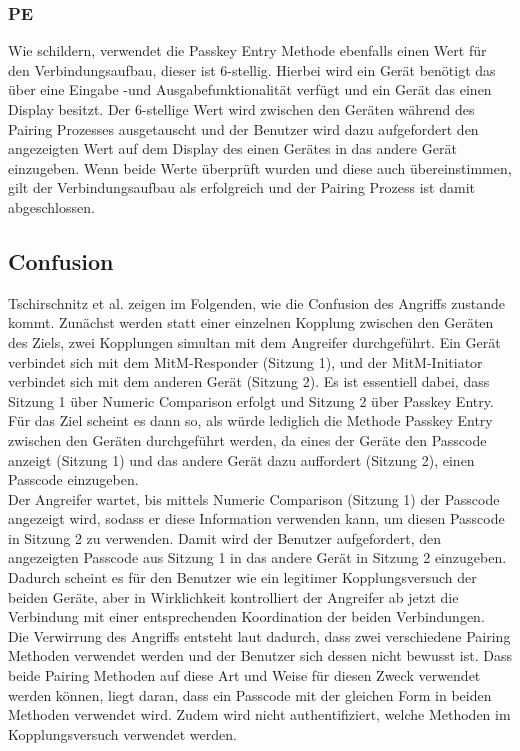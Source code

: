 \documentclass[
    a4paper,
    pagesize,
    pdftex,
    12pt,
]{scrartcl}
\begin{document}
    \subsubsection{PE}
    Wie \cite{method_confusion_attack} schildern, verwendet die Passkey Entry Methode ebenfalls einen Wert für den Verbindungsaufbau, dieser ist 6-stellig. Hierbei wird ein Gerät benötigt das über eine Eingabe -und Ausgabefunktionalität verfügt und ein Gerät das einen Display besitzt. Der 6-stellige Wert wird zwischen den Geräten während des Pairing Prozesses ausgetauscht und der Benutzer wird dazu aufgefordert den angezeigten Wert auf dem Display des einen Gerätes in das andere Gerät einzugeben. Wenn beide Werte überprüft wurden und diese auch übereinstimmen, gilt der Verbindungsaufbau als erfolgreich und der Pairing Prozess ist damit abgeschlossen.

    \subsection{Confusion}
    Tschirschnitz et al. \cite{method_confusion_attack} zeigen im Folgenden, wie die Confusion des Angriffs zustande kommt. Zunächst werden statt einer einzelnen Kopplung zwischen den Geräten des Ziels, zwei Kopplungen simultan mit dem Angreifer durchgeführt. Ein Gerät verbindet sich mit dem MitM-Responder (Sitzung 1), und der MitM-Initiator verbindet sich mit dem anderen Gerät (Sitzung 2). Es ist essentiell dabei, dass Sitzung 1 über Numeric Comparison erfolgt und Sitzung 2 über Passkey Entry. Für das Ziel scheint es dann so, als würde lediglich die Methode Passkey Entry zwischen den Geräten durchgeführt werden, da eines der Geräte den Passcode anzeigt (Sitzung 1)  und das andere Gerät dazu auffordert (Sitzung 2), einen Passcode einzugeben. \\
    Der Angreifer wartet, bis mittels Numeric Comparison (Sitzung 1) der Passcode angezeigt wird, sodass er diese Information verwenden kann, um diesen Passcode in Sitzung 2 zu verwenden. Damit wird der Benutzer aufgefordert, den angezeigten Passcode aus Sitzung 1 in das andere Gerät in Sitzung 2 einzugeben. Dadurch scheint es für den Benutzer wie ein legitimer Kopplungsversuch der beiden Geräte, aber in Wirklichkeit kontrolliert der Angreifer ab jetzt die Verbindung mit einer entsprechenden Koordination der beiden Verbindungen. \\
    Die Verwirrung des Angriffs entsteht laut \cite{method_confusion_attack} dadurch, dass zwei verschiedene Pairing Methoden verwendet werden und der Benutzer sich dessen nicht bewusst ist. Dass beide Pairing Methoden auf diese Art und Weise für diesen Zweck verwendet werden können, liegt daran, dass ein Passcode mit der gleichen Form in beiden Methoden verwendet wird. Zudem wird nicht authentifiziert, welche Methoden im Kopplungsversuch verwendet werden.
\end{document}
